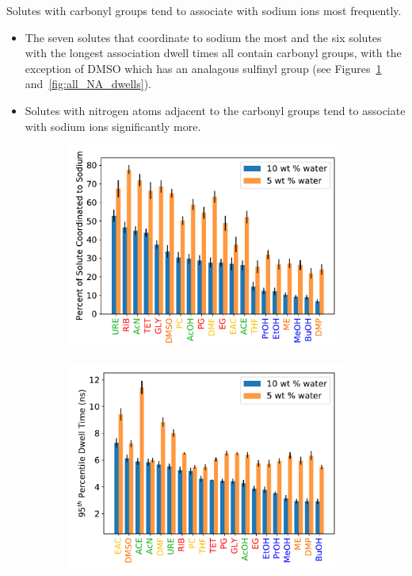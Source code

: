 \documentclass{article}
\begin{document}
  \noindent Solutes with carbonyl groups tend to associate with sodium ions most frequently.
  \begin{itemize}
    \item The seven solutes that coordinate to sodium the most and 
    the six solutes with the longest association dwell times all contain 
    carbonyl groups, with the exception of DMSO which has an analagous sulfinyl group
    (see Figures~\ref{fig:all_solutes_NA_coordination} and~\ref{fig:all_NA_dwells}).
	\item Solutes with nitrogen atoms adjacent to the carbonyl groups tend to
	associate with sodium ions significantly more. 
  \end{itemize}
  
  \begin{figure}[!htb]
  \centering
  \begin{subfigure}{0.45\textwidth}
  \includegraphics[width=\textwidth]{all_solutes_NA_coordination.pdf}
  \caption{}\label{fig:all_solutes_NA_coordination}
  \end{subfigure}
  \begin{subfigure}{0.45\textwidth}
  \includegraphics[width=\textwidth]{all_NA_dwells.pdf}

\end{subfigure}
\end{figure}
\end{document}
